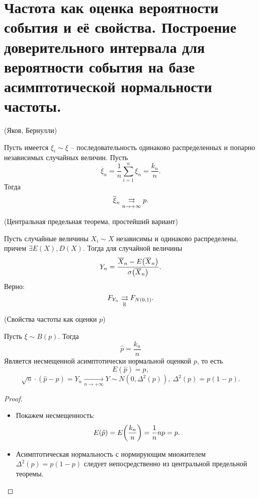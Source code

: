 \section{Частота как оценка вероятности события и её свойства.
    Построение доверительного интервала для вероятности события
на базе асимптотической нормальности частоты.}

\begin{theorem}(Яков, Бернулли)

    Пусть имеется $\xi_i \sim \xi$ -- последовательность одинаково 
    распределенных и попарно независимых случайных величин. Пусть
    \[
        \overline{\xi}_n = \frac{1}{n} \sum_{i = 1}^n{\xi_n} = \frac{k_n}{n}
    .\]
    Тогда
    \[
        \overline{\xi}_n \underset{n \to +\infty}{\rightrightarrows} p
    .\]
\end{theorem}

\begin{theorem}(Центральная предельная теорема, простейший вариант)

    Пусть случайные величины $X_i \sim X$ независимы и одинаково распределены,
    причем $\exists E(X), D(X)$. Тогда для случайной величины
    \[
        Y_n = \frac{\overline{X}_n - E\parens*{\overline{X}_n}}
        {\sigma\parens*{\overline{X}_n}}
    .\]
    Верно:
    \[
        F_{Y_n} \underset{\mathbb{R}}{\rightrightarrows} F_{N(0, 1)}
    .\]
\end{theorem}

\begin{theorem}(Свойства частоты как оценки $p$)

    Пусть $\xi \sim B(p)$. Тогда 
    \[
        \hat{p} = \frac{k_n}{n}
    \]
    Является несмещенной асимптотически нормальной оценкой $p$, то есть
    \[
        E(\hat{p}) = p,
    \]
    \[
        \sqrt{n} \cdot (\hat{p} - p) = Y_n \xrightarrow[n \to +\infty]{} Y 
        \sim N(0, \Delta^2(p)),~ \Delta^2(p) = p(1 - p)
    .\]
\end{theorem}
\begin{proof}
    \enewline
    \begin{itemize}
        \item Покажем несмещенность:
            \[
                E(\hat{p}) = E\parens*{\frac{k_n}{n}} = \frac{1}{n} np = p
            .\]
        \item Асимптотическая нормальность с нормирующим множителем
            $\Delta^2(p) = p(1 - p)$ следует непосредственно из
            центральной предельной теоремы.
    \end{itemize}
\end{proof}


